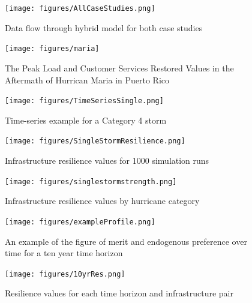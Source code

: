 \begin{figure}[h]
  \centerline{\texttt{[image: figures/AllCaseStudies.png]}}
  \label{f:CaseStudyMethodology}
  \caption{Data flow through hybrid model for both case studies}
\end{figure}
\pagebreak

\begin{figure}[h]
  \label{f:Maria}
  \texttt{[image: figures/maria]}
  \caption{The Peak Load and Customer Services Restored Values in the
    Aftermath of Hurrican Maria in Puerto Rico}
\end{figure}
\pagebreak


\begin{figure}[h]
  \label{f:TS_SingleStorm}
  \texttt{[image: figures/TimeSeriesSingle.png]}
  \caption{Time-series example for a Category 4 storm}
\end{figure}
\pagebreak

\begin{figure}[h]
  \label{f:SingleStorm}
  \texttt{[image: figures/SingleStormResilience.png]}
  \caption{Infrastructure resilience values for 1000 simulation runs}
\end{figure}
\pagebreak

\begin{figure}[h]
  \label{f:SingleStrongestStorm}
  \texttt{[image: figures/singlestormstrength.png]}
  \caption{Infrastructure resilience values by hurricane category}
\end{figure}
\pagebreak
% 
% 
% 

\begin{figure}[h]
  \label{f:exampleProfile}
  \texttt{[image: figures/exampleProfile.png]}
  \caption{An example of the figure of merit and endogenous preference
    over time for a ten year time horizon}
\end{figure}
\pagebreak

\begin{figure}[h]
  \label{f:10yrRes}
  \texttt{[image: figures/10yrRes.png]}
  \caption{Resilience values for each time horizon and infrastructure pair}
\end{figure}
\pagebreak

%

% 
% 

